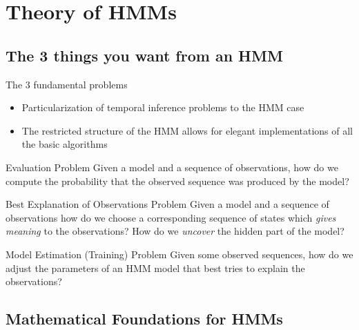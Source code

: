 \section{Theory of HMMs}
\label{sec:theory}

\subsection{The 3 things you want from an HMM}
\label{sec:problems}

\begin{frame}
  
  The 3 fundamental problems \parencite{rabiner1989tutorial}
  \begin{itemize}
  	\item Particularization of temporal inference problems to the HMM case
  	\item The restricted structure of the HMM allows for elegant implementations of all the basic algorithms
  \end{itemize}
  \pause

  \begin{block}{Evaluation Problem}
    Given a model and a sequence of observations, how do we compute the probability that the \alert{observed 
    sequence} was produced by the model?
  \end{block}
  \pause
  \begin{block}{Best Explanation of Observations Problem}
    Given a model and a sequence of observations how do we choose a corresponding sequence of \alert{states} which 
    \emph{gives meaning} to the observations? How do we \emph{uncover} the hidden part of the model?
  \end{block}
  \pause
  \begin{block}{Model Estimation (Training) Problem}
    Given some observed sequences, how do we adjust the \alert{parameters} of an HMM model that best tries to explain 
    the observations? 
    
  \end{block}

\end{frame}


\subsection{Mathematical Foundations for HMMs}
\label{sec:math}


